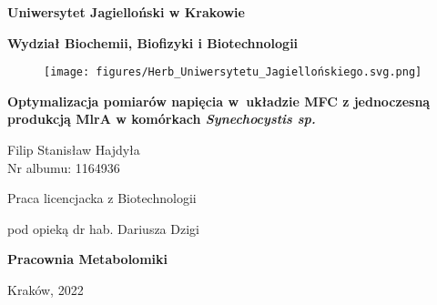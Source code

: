 \begin{titlepage}
    \thispagestyle{empty}
    \begin{center}
    
        \textbf{\large Uniwersytet Jagielloński w Krakowie}
        
        \vspace{0.5cm}
        
        \textbf{\Large Wydział Biochemii, Biofizyki i Biotechnologii}
        
        \vspace{0.5cm}
        
        \begin{figure}[h]
            \centering
            \texttt{[image: figures/Herb\_Uniwersytetu\_Jagiellońskiego.svg.png]}
            \label{fig:title}
        \end{figure}
        
        \vspace{0.5cm}

        \textbf{\huge Optymalizacja pomiarów napięcia w~układzie MFC z jednoczesną produkcją MlrA w komórkach \textit{Synechocystis sp.}}

        \vspace{2cm}

        {\Large Filip Stanisław Hajdyła}\\
        Nr albumu: 1164936

        \vspace{2cm}
        
        {\large Praca licencjacka z Biotechnologii}
        
        \vspace{0.5cm}
        
        {\large pod opieką dr hab. Dariusza Dzigi}
        
        \vspace{1cm}
        
        \textbf{\Large Pracownia Metabolomiki}
        
        \vspace{2cm}
        
        Kraków, 2022
        
    \end{center}
\end{titlepage}